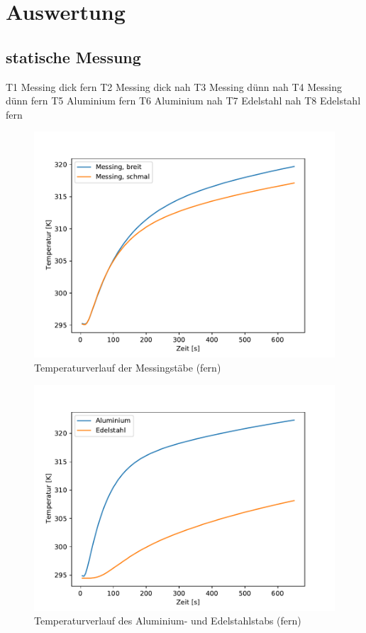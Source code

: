 \section{Auswertung}
\label{sec:Auswertung}

\subsection{statische Messung}
\label{subsec:stat}

T1 Messing dick fern
T2 Messing dick nah
T3 Messing dünn nah 
T4 Messing dünn fern
T5 Aluminium fern
T6 Aluminium nah
T7 Edelstahl nah
T8 Edelstahl fern

\begin{figure}[!htbp]
  \centering
  \includegraphics{content/verlauf_mess.pdf}
  \caption{Temperaturverlauf der Messingstäbe (fern)}
  \label{fig:mess}
\end{figure}

\begin{figure}[!htbp]
  \centering
  \includegraphics{content/verlauf_alu_edel.pdf}
  \caption{Temperaturverlauf des Aluminium- und Edelstahlstabs (fern)}
  \label{fig:alu_edel}
\end{figure}


